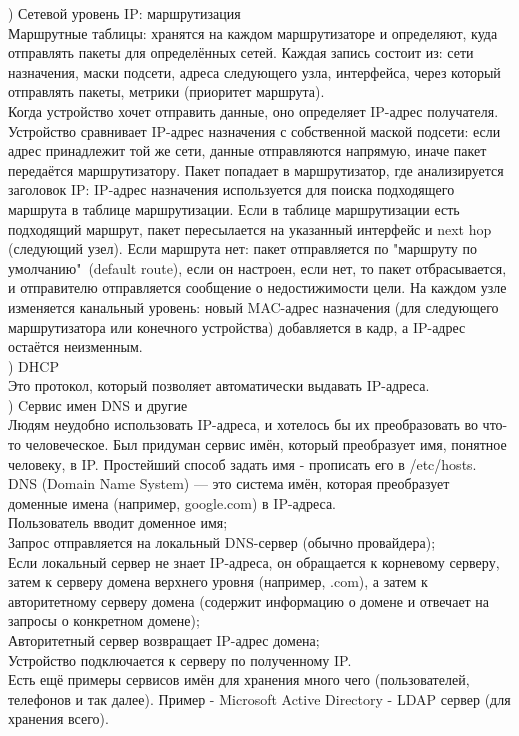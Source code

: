) Сетевой уровень IP: маршрутизация \\
Маршрутные таблицы: хранятся на каждом маршрутизаторе и определяют, куда отправлять пакеты для определённых сетей. Каждая запись состоит из: сети назначения, маски подсети, адреса следующего узла, интерфейса, через который отправлять пакеты, метрики (приоритет маршрута). \\
Когда устройство хочет отправить данные, оно определяет IP-адрес получателя. Устройство сравнивает IP-адрес назначения с собственной маской подсети: если адрес принадлежит той же сети, данные отправляются напрямую, иначе пакет передаётся маршрутизатору. Пакет попадает в маршрутизатор, где анализируется заголовок IP: IP-адрес назначения используется для поиска подходящего маршрута в таблице маршрутизации. Если в таблице маршрутизации есть подходящий маршрут, пакет пересылается на указанный интерфейс и next hop (следующий узел).
Если маршрута нет: пакет отправляется по "маршруту по умолчанию"\, (default route), если он настроен, если нет, то пакет отбрасывается, и отправителю отправляется сообщение о недостижимости цели. На каждом узле изменяется канальный уровень: новый MAC-адрес назначения (для следующего маршрутизатора или конечного устройства) добавляется в кадр, а IP-адрес остаётся неизменным. \\

) DHCP \\
Это протокол, который позволяет автоматически выдавать IP-адреса. \\

) Cервис имен DNS и другие  \\
Людям неудобно использовать IP-адреса, и хотелось бы их преобразовать во что-то человеческое. Был придуман сервис имён, который преобразует имя, понятное человеку, в IP. Простейший способ задать имя - прописать его в /etc/hosts. \\
DNS (Domain Name System) — это система имён, которая преобразует доменные имена (например, google.com) в IP-адреса. \\
Пользователь вводит доменное имя; \\
Запрос отправляется на локальный DNS-сервер (обычно провайдера); \\
Если локальный сервер не знает IP-адреса,
он обращается к корневому серверу, затем к серверу домена верхнего уровня (например, .com), а затем к авторитетному серверу домена (содержит информацию о домене и отвечает на запросы о конкретном домене); \\
Авторитетный сервер возвращает IP-адрес домена;  \\
Устройство подключается к серверу по полученному IP. \\
Есть ещё примеры сервисов имён для хранения много чего (пользователей, телефонов и так далее). Пример - Microsoft Active Directory - LDAP сервер (для хранения всего). \\

